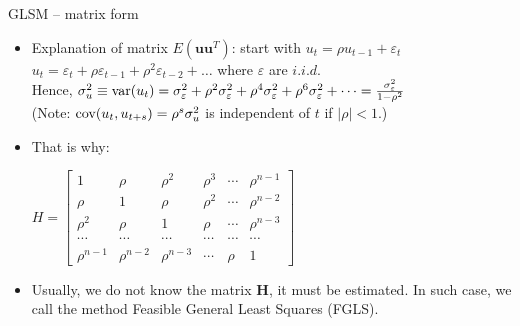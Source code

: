 \documentclass{beamer}
\begin{document}
\begin{frame}{GLSM – matrix form}
\begin{itemize}
\item Explanation of matrix $E(\boldsymbol{uu}^T)$: start with $u_t = \rho u_{t-1}+ \varepsilon_t$\\
$u_t= \varepsilon_t + \rho \varepsilon_{t-1} + \rho^2 \varepsilon_{t-2} + \dots$ \qquad where $\varepsilon$ are $i.i.d.$\\
Hence, $\sigma^2_u \equiv \textnormal{var}(u_t)= 
\sigma^2_{\varepsilon} + \rho^2 \sigma^2_{\varepsilon} + \rho^4 \sigma^2_{\varepsilon} 
+ \rho^6 \sigma^2_{\varepsilon} + \dots
= \frac{\sigma^2_{\varepsilon}}{1-\rho^2}$\\
(Note: $\textnormal{cov}(u_t,u_{t+s})=\rho^s \sigma^2_u$ is independent of $t$ if $|\rho|<1$.)\\
\vspace{0.3cm}
\item That is why: 

$H=\begin{bmatrix}
    1&  \rho & \rho^2 & \rho^3 & \cdots & \rho^{n-1}\\
    \rho &  1&  \rho & \rho^2 & \cdots & \rho^{n-2} \\ 
    \rho^2 &  \rho &  1& \rho  & \cdots & \rho^{n-3} \\ 
    \cdots & \cdots & \cdots & \cdots & \cdots & \cdots \\
     \rho^{n-1} & \rho^{n-2} & \rho^{n-3} & \cdots & \rho & 1
\end{bmatrix}$
\vspace{0.3cm}
\item Usually, we do not know the matrix $\boldsymbol{H}$, it must be estimated. In such case, we call the method Feasible General Least Squares (FGLS).
\end{itemize}
\end{frame}

\end{document}
